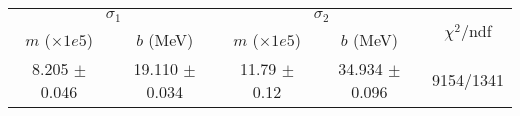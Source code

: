 \begin{tabular}{cc|cc||c}
\multicolumn{2}{c|}{$\sigma_1$} & \multicolumn{2}{|c}{$\sigma_2$} & \multirow{2}{*}{$\chi^2/$ndf} \\
$m$ ($\times1e5$) & $b$ (MeV) & $m$ ($\times1e5$) & $b$ (MeV) & \\
\hline
8.205 $\pm$ 0.046 & 19.110 $\pm$ 0.034 & 11.79 $\pm$ 0.12 & 34.934 $\pm$ 0.096 & 9154/1341\\
\end{tabular}
